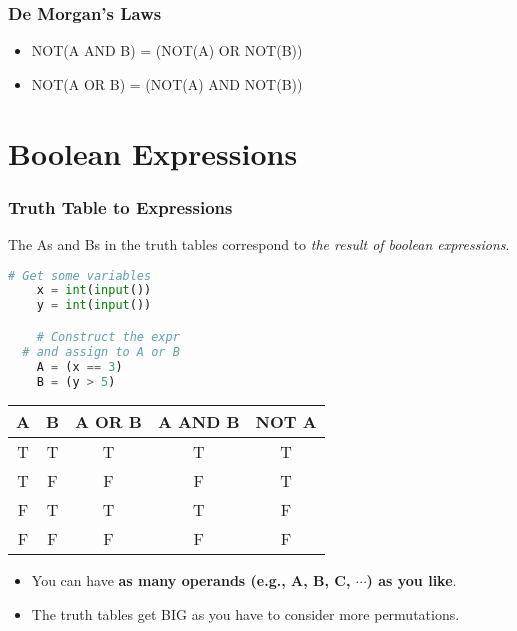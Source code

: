 \documentclass{beamer}
\begin{document}
%
%
\begin{frame}[fragile]
	\frametitle{De Morgan's Laws}
	\centering
	\begin{itemize}
		\item NOT(A AND B) = (NOT(A) OR NOT(B))
		\item NOT(A OR B) = (NOT(A) AND NOT(B))
	\end{itemize}
\end{frame}


\section{Boolean Expressions}

%
%
\begin{frame}[fragile]
	\frametitle{Truth Table to Expressions}
	\vfill
	The As and Bs in the truth tables correspond to \textit{the result of boolean expressions}.
	\vfill
	\begin{minipage}{0.4\textwidth}
		\begin{lstlisting}[language=Python,autogobble]
	# Get some variables 
	x = int(input())
	y = int(input())

	# Construct the expr
  # and assign to A or B
	A = (x == 3)
	B = (y > 5)
		\end{lstlisting}
	\end{minipage}
	\begin{minipage}{0.59\textwidth}
		\begin{table}[]
			\begin{tabular}{|cc|c|c|c|}
				{\color[HTML]{CD9934} \textbf{A}} & {\color[HTML]{3531FF} \textbf{B}} & \textbf{A OR B} & \textbf{A AND B} & \textbf{NOT A} \\ \hline
				{\color[HTML]{CD9934} T}          & {\color[HTML]{3531FF} T}          & T               & T                & T              \\
				{\color[HTML]{CD9934} T}          & {\color[HTML]{3531FF} F}          & F               & F                & T              \\
				{\color[HTML]{CD9934} F}          & {\color[HTML]{3531FF} T}          & T               & T                & F              \\
				{\color[HTML]{CD9934} F}          & {\color[HTML]{3531FF} F}          & F               & F                & F             
			\end{tabular}
		\end{table}
	\end{minipage}
	\vfill
	\pause
	\begin{itemize}
		\item You can have \textbf{as many operands (e.g., A, B, C, $\cdots$) as you like}.
		\item The truth tables get BIG as you have to consider more permutations.
	\end{itemize}
\end{frame}
\end{document}
